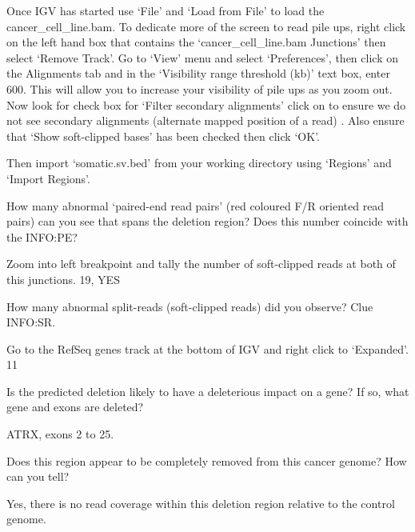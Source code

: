 \begin{information}
Once IGV has started use ‘File’ and ‘Load from File’ to load the cancer\_cell\_line.bam. To dedicate more of the screen to read pile ups, right click on the left hand box that contains the ‘cancer\_cell\_line.bam Junctions’ then select ‘Remove Track’. Go to ‘View’ menu and select ‘Preferences’, then click on the Alignments tab and in the ‘Visibility range threshold (kb)’ text box, enter 600. This will allow you to increase your visibility of pile ups as you zoom out. Now look for check box for ‘Filter secondary alignments’ click on to ensure we do not see secondary alignments (alternate mapped position of a read) . Also ensure that ‘Show soft-clipped bases’ has been checked then click ‘OK’.
 
Then import ‘somatic.sv.bed’ from your working directory using ‘Regions’ and ‘Import Regions’. 

\end{information}


\begin{questions}
How many abnormal ‘paired-end read pairs’ (red coloured F/R oriented read pairs) can you see that spans the deletion region? Does this number coincide with the INFO:PE? 
\begin{answer}
Zoom into left breakpoint and tally the number of soft-clipped reads at both of this junctions.
19, YES
\end{answer}

How many abnormal split-reads (soft-clipped reads) did you observe? Clue INFO:SR.
\begin{answer}
Go to the RefSeq genes track at the bottom of IGV and right click to ‘Expanded’.
11
\end{answer}
Is the predicted deletion likely to have a deleterious impact on a gene? If so, what gene and exons are deleted?
\begin{answer}
ATRX, exons 2 to 25.
\end{answer}
Does this region appear to be completely removed from this cancer genome? How can you tell?
\begin{answer}
Yes, there is no read coverage within this deletion region relative to the control genome. 
\end{answer}
\end{questions}




